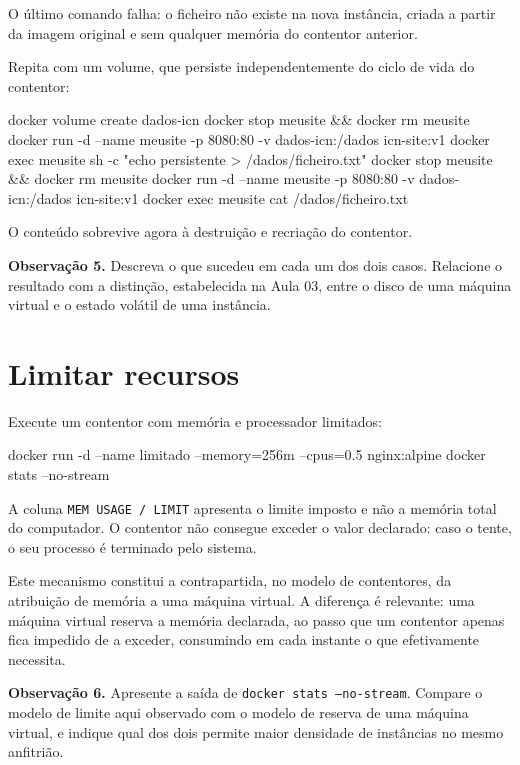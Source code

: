 \documentclass[11pt,a4paper]{article}
\begin{document}
O último comando falha: o ficheiro não existe na nova instância, criada a partir da imagem original e sem qualquer memória do contentor anterior.

Repita com um volume, que persiste independentemente do ciclo de vida do contentor:

\begin{terminal}
docker volume create dados-icn
docker stop meusite && docker rm meusite
docker run -d --name meusite -p 8080:80 -v dados-icn:/dados icn-site:v1
docker exec meusite sh -c "echo persistente > /dados/ficheiro.txt"
docker stop meusite && docker rm meusite
docker run -d --name meusite -p 8080:80 -v dados-icn:/dados icn-site:v1
docker exec meusite cat /dados/ficheiro.txt
\end{terminal}

O conteúdo sobrevive agora à destruição e recriação do contentor.

\begin{registo}
\textbf{Observação 5.} Descreva o que sucedeu em cada um dos dois casos. Relacione o resultado com a distinção, estabelecida na Aula 03, entre o disco de uma máquina virtual e o estado volátil de uma instância.
\end{registo}

\section{Limitar recursos}

Execute um contentor com memória e processador limitados:

\begin{terminal}
docker run -d --name limitado --memory=256m --cpus=0.5 nginx:alpine
docker stats --no-stream
\end{terminal}

A coluna \texttt{MEM USAGE / LIMIT} apresenta o limite imposto e não a memória total do computador. O contentor não consegue exceder o valor declarado: caso o tente, o seu processo é terminado pelo sistema.

Este mecanismo constitui a contrapartida, no modelo de contentores, da atribuição de memória a uma máquina virtual. A diferença é relevante: uma máquina virtual reserva a memória declarada, ao passo que um contentor apenas fica impedido de a exceder, consumindo em cada instante o que efetivamente necessita.

\begin{registo}
\textbf{Observação 6.} Apresente a saída de \texttt{docker stats --no-stream}. Compare o modelo de limite aqui observado com o modelo de reserva de uma máquina virtual, e indique qual dos dois permite maior densidade de instâncias no mesmo anfitrião.
\end{registo}
\end{document}
